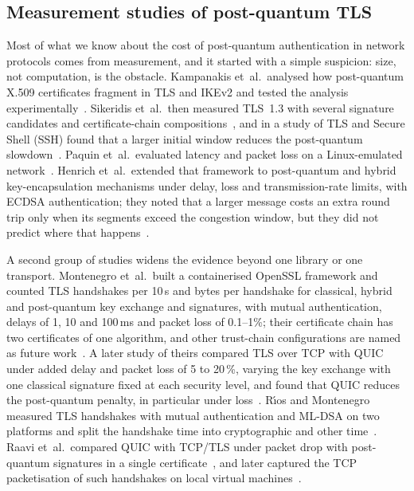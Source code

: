 \documentclass[preprint,12pt]{elsarticle}
\newcommand{\ms}{\,ms\xspace}
\begin{document}
\subsection{Measurement studies of post-quantum TLS}
\label{sec:related-meas}
Most of what we know about the cost of post-quantum authentication in network protocols comes from measurement, and it started with a simple suspicion: size, not computation, is the obstacle. Kampanakis et~al.\ analysed how post-quantum X.509 certificates fragment in TLS and IKEv2 and tested the analysis experimentally~\cite{kampanakis2018}. Sikeridis et~al.\ then measured TLS~1.3 with several signature candidates and certificate-chain compositions~\cite{sikeridis2020}, and in a study of TLS and Secure Shell (SSH) found that a larger initial window reduces the post-quantum slowdown~\cite{sikeridis2020b}. Paquin et~al.\ evaluated latency and packet loss on a Linux-emulated network~\cite{paquin2020}. Henrich et~al.\ extended that framework to post-quantum and hybrid key-encapsulation mechanisms under delay, loss and transmission-rate limits, with ECDSA authentication; they noted that a larger message costs an extra round trip only when its segments exceed the congestion window, but they did not predict where that happens~\cite{henrich2023}.

A second group of studies widens the evidence beyond one library or one transport. Montenegro et~al.\ built a containerised OpenSSL framework and counted TLS handshakes per 10\,s and bytes per handshake for classical, hybrid and post-quantum key exchange and signatures, with mutual authentication, delays of 1, 10 and 100\ms and packet loss of 0.1--1\%; their certificate chain has two certificates of one algorithm, and other trust-chain configurations are named as future work~\cite{montenegro2026}. A later study of theirs compared TLS over TCP with QUIC under added delay and packet loss of 5 to 20\,\%, varying the key exchange with one classical signature fixed at each security level, and found that QUIC reduces the post-quantum penalty, in particular under loss~\cite{montenegro2026quic}. R{\'\i}os and Montenegro measured TLS handshakes with mutual authentication and ML-DSA on two platforms and split the handshake time into cryptographic and other time~\cite{rios2026}. Raavi et~al.\ compared QUIC with TCP/TLS under packet drop with post-quantum signatures in a single certificate~\cite{raavi2022quic}, and later captured the TCP packetisation of such handshakes on local virtual machines~\cite{raavi2025}.
\end{document}
